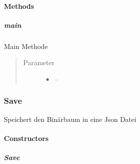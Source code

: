 \documentclass[letterpaper,10pt,ngerman]{sphinxmanual}
\begin{document}
\paragraph{Methods}
\label{\detokenize{com/linuxluigi/edu/Main:methods}}

\subparagraph{main}
\label{\detokenize{com/linuxluigi/edu/Main:id1}}

\begin{fulllineitems}
\label{\detokenize{com/linuxluigi/edu/Main:com.linuxluigi.edu.Main.main(String__)}}
Main Methode
\begin{quote}\begin{description}
\item[{Parameter}] \leavevmode\begin{itemize}
\item {} 
 -- 

\end{itemize}

\end{description}\end{quote}

\end{fulllineitems}



\subsubsection{Save}
\label{\detokenize{com/linuxluigi/edu/Save::doc}}\label{\detokenize{com/linuxluigi/edu/Save:save}}

\begin{fulllineitems}
\label{\detokenize{com/linuxluigi/edu/Save:com.linuxluigi.edu.Save}}
Speichert den Binärbaum in eine Json Datei

\end{fulllineitems}



\paragraph{Constructors}
\label{\detokenize{com/linuxluigi/edu/Save:constructors}}

\subparagraph{Save}
\label{\detokenize{com/linuxluigi/edu/Save:id1}}
\end{document}
